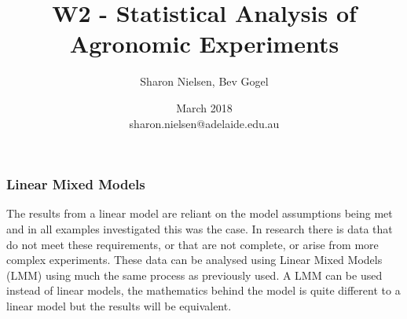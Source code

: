 
%
%



\usepackage{hyperref}
\usepackage{multirow}
\usepackage{graphics}
\usepackage{epsfig}
\usepackage{verbatim}
\usepackage{fancyvrb}
\usepackage{shortvrb}
\usepackage{moreverb}
\usepackage[dvips]{rotating}
\usepackage{pifont}
\usepackage{tikz}
\usepackage{apacite}
\usepackage{booktabs}
\newcommand{\head}[1]{\textnormal{\textbf{#1}}}


\usepackage{setspace}
\usepackage{graphicx}
\usepackage{amsmath}
\usepackage{multicol}
\usepackage{wasysym}
\usepackage{colortbl}


\usepackage[light]{iwona}
\usepackage[T1]{fontenc}

\usepackage{listings}%
\lstset{
  basicstyle=\ttfamily,
  mathescape
}




\title[W1 - Analysis]{W2 - Statistical Analysis of Agronomic Experiments}
\author{Sharon Nielsen, Bev Gogel}
\date{March 2018 \\ \vspace{0.2cm}\footnotesize  sharon.nielsen@adelaide.edu.au}







\begin{frame}\frametitle{Linear Mixed Models}
The results from a linear model are reliant on the model assumptions being met and in all examples
investigated this was the case. In research there is data that do not meet these requirements, or
that are not complete, or arise from more complex experiments. These data can be analysed using Linear
Mixed Models (LMM) using much the same process as previously used. A LMM can be used instead of linear models, the
mathematics behind the model is quite different to a linear model but the results will be equivalent.
\end{frame}


